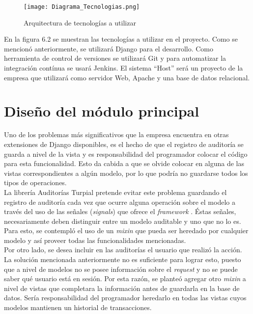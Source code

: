 \begin{figure}
\centering
\texttt{[image: Diagrama\_Tecnologias.png]}
\caption{Arquitectura de tecnologías a utilizar}
\label{fig:figure6.2}
\end{figure}

En la figura 6.2 se muestran las tecnologías a utilizar en el proyecto. Como se mencionó anteriormente, se utilizará Django para el desarrollo. Como herramienta de control de versiones se utilizará Git y para automatizar la integración contínua se usará Jenkins. El sistema “Host” será un proyecto de la empresa que utilizará como servidor Web, Apache y una base de datos relacional.

\section{Diseño del módulo principal}

Uno de los problemas más significativos que la empresa encuentra en otras extensiones de Django disponibles, es el hecho de que el registro de auditoría se guarda a nivel de la vista y es responsabilidad del programador colocar el código para esta funcionalidad. Esto da cabida a que se olvide colocar en alguna de las vistas correspondientes a algún modelo, por lo que podría no guardarse todos los tipos de operaciones. \\

La librería Auditorías Turpial pretende evitar este problema guardando el registro de auditoría cada vez que ocurre alguna operación sobre el modelo a través del uso de las señales (\textit{signals}) que ofrece el \textit{framework} . Éstas señales, necesariamente deben distinguir entre un modelo auditable y uno que no lo es. Para esto, se contempló el uso de un \textit{mixin} que pueda ser heredado por cualquier modelo y así proveer todas las funcionalidades mencionadas. \\

Por otro lado, se desea incluir en las auditorías el usuario que realizó la acción. La solución mencionada anteriormente no es suficiente para lograr esto, puesto que a nivel de modelos no se posee información sobre el \textit{request} y no se puede saber qué usuario está en sesión. Por esta razón, se planteó agregar otro \textit{mixin} a nivel de vistas que completara la información antes de guardarla en la base de datos. Sería responsabilidad del programador heredarlo en todas las vistas cuyos modelos mantienen un historial de transacciones.
 \\

